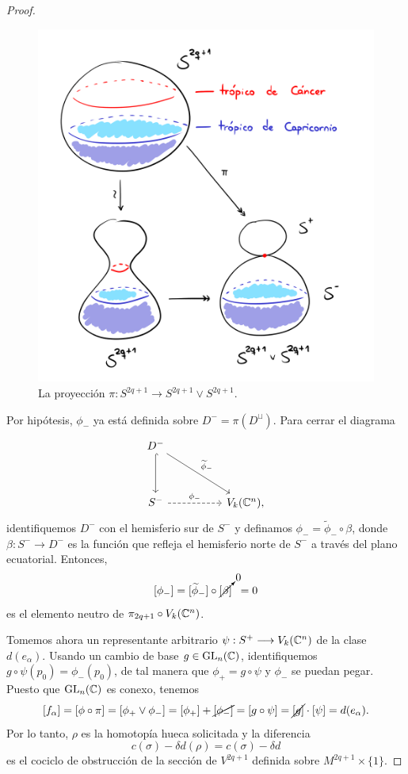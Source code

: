 \begin{proof}
\begin{figure}[ht]
    \centering
    \includegraphics[scale=0.20]{spheres.png}
    \caption {La proyección $\pi : S^{2q+1} \to S^{2q+1} \vee S^{2q+1}$.}
\end{figure}

Por hipótesis, $\phi_-$ ya está definida sobre $D^- = \pi(D^\sqcup)$. Para cerrar el diagrama
$$
\begin{tikzcd}[row sep = huge, column sep = huge]
    D^- \arrow[d, hook] \arrow[rd, "\widetilde \phi_-"] \\
    S^- \arrow[r, dashed, "\phi_-"] & V_k(\C^n),
\end{tikzcd}
$$
identifiquemos $D^-$ con el hemisferio sur de $S^-$ y definamos $\phi_- = \widetilde \phi_- \circ \beta$, donde $\beta : S^- \to D^-$ es la función que refleja el hemisferio norte de $S^-$ a través del plano ecuatorial. Entonces,
$$[\phi_-] = [\widetilde \phi_-] \circ \cancelto 0 {[\beta]} \, \, \, = 0$$
es el elemento neutro de $\pi_{2q+1} \circ V_k(\mathbb C^n)$.

Tomemos ahora un representante arbitrario $\psi : S^+ \longrightarrow V_k(\mathbb C^n)$ de la clase $d(e_\alpha)$. Usando un cambio de base $g \in \operatorname{GL}_n(\mathbb C)$, identifiquemos $g \circ \psi(p_0) = \phi_-(p_0)$, de tal manera que $\phi_+ = g \circ \psi$ y $\phi_-$ se puedan pegar. Puesto que $\operatorname{GL}_n(\mathbb C)$ es conexo, tenemos
$$
[f_\alpha]
    = [\phi \circ \pi]
    = [\phi_+ \vee \phi_-]
    = [\phi_+] + \cancel {[\phi_-]}
    = [g \circ \psi]
    = \cancel {[g]} \cdot [\psi]
    = d(e_\alpha).
$$
Por lo tanto, $\rho$ es la homotopía hueca solicitada y la diferencia
$$c(\sigma) - \delta d(\rho) = c(\sigma) - \delta d$$
es el cociclo de obstrucción de la sección de $V^{2q+1}$ definida sobre $M^{2q+1} \times \{ 1 \}$.
\end{proof}
